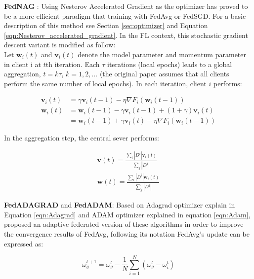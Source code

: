 \textbf{FedNAG} \cite{yang2022}: Using Nesterov Accelerated Gradient as the optimizer has proved to be a more efficient paradigm that training with FedAvg or FedSGD. For a basic description of this method see Section \ref{sec:optimizer} and Equation \ref{eqn:Nesterov_accelerated_gradient}. In the FL context, this stochastic gradient descent variant is modified as follow:\\
Let $\boldsymbol{w}_i (t)$ and $\boldsymbol{v}_i(t)$ denote the model parameter and momentum parameter in client i at $t$th iteration. Each $\tau$ iterations (local epochs) leads to a global aggregation, $t = k\tau$, $k=1,2,...$ (the original paper assumes that all clients perform the same number of local epochs). In each iteration, client $i$ performs:

\begin{align*}
  \boldsymbol{v}_i(t) &= \gamma \boldsymbol{v}_i(t-1) - \eta \nabla F_i (\boldsymbol{w}_i(t-1))\\
  \boldsymbol{w}_i(t) &= \boldsymbol{w}_i(t-1) - \gamma \boldsymbol{v}_i (t-1) + (1+\gamma) \boldsymbol{v}_i(t)\\
  &= \boldsymbol{w}_i(t-1) + \gamma \boldsymbol{v}_i(t) - \eta \nabla F_i(\boldsymbol{w}_i(t-1))
\end{align*}

In the aggregation step, the central sever performs:

\begin{align*}
  \boldsymbol{v}(t) = \frac{\sum_{i} |D^i| \boldsymbol{v}_i(t)}{\sum_j |D^j|} \\
  \boldsymbol{w}(t) = \frac{\sum_{i} |D^i| \boldsymbol{w}_i(t)}{\sum_j |D^j|}
\end{align*}

\textbf{FedADAGRAD} and \textbf{FedADAM}: Based on Adagrad optimizer explain in Equation \ref{eqn:Adagrad} and ADAM optimizer explained in equation \ref{eqn:Adam}, \cite{reddi2021} proposed an adaptive federated version of these algorithms in order to improve the convergence results of FedAvg, following its notation FedAvg's update can be expressed as:

\begin{equation*}
  \omega_g^{t+1} = \omega_g^t - \frac{1}{N} \sum_{i=1}^N (\omega_g^t - \omega_i^t)
\end{equation*}

